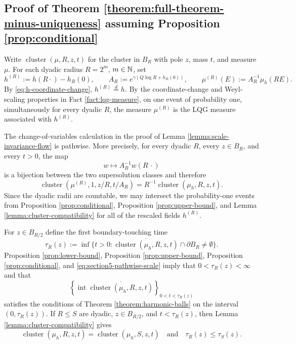 \documentclass[12pt]{amsart}
\numberwithin{equation}{section}
\begin{document}
	\subsection{Proof of Theorem \ref{theorem:full-theorem-minus-uniqueness} assuming Proposition \ref{prop:conditional}}
	Write $\operatorname{cluster}(\mu,R,z,t)$ for the cluster in $B_R$ with pole $z$, mass $t$, and measure $\mu$. For each dyadic radius $R=2^m$, $m\in\mathbb{N}$, set
	\begin{equation} \label{eq:section5-rescaled-data}
	 h^{(R)}:=h(R\cdot)-h_R(0),\qquad
	 A_R:=e^{\gamma(Q\log R+h_R(0))},\qquad
	 \mu^{(R)}(E):=A_R^{-1}\mu_h(RE).
	\end{equation}
	By \eqref{eq:h-coordinate-change}, $h^{(R)}\overset{d}{=}h$. By the coordinate-change and Weyl-scaling properties in Fact \ref{fact:lqg-measure}, on one event of probability one, simultaneously for every dyadic $R$, the measure $\mu^{(R)}$ is the LQG measure associated with $h^{(R)}$.

	The change-of-variables calculation in the proof of Lemma \ref{lemma:scale-invariance-flow} is pathwise. More precisely, for every dyadic $R$, every $z\in B_R$, and every $t>0$, the map
	\[
	 w\longmapsto A_R^{-1}w(R\,\cdot)
	\]
	is a bijection between the two supersolution classes and therefore
	\begin{equation} \label{eq:section5-pathwise-scale}
	 \operatorname{cluster}(\mu^{(R)},1,z/R,t/A_R)
	 =R^{-1}\operatorname{cluster}(\mu_h,R,z,t).
	\end{equation}
	Since the dyadic radii are countable, we may intersect the probability-one events from Proposition \ref{prop:conditional}, Proposition \ref{prop:upper-bound}, and Lemma \ref{lemma:cluster-compatibility} for all of the rescaled fields $h^{(R)}$.

	For $z\in B_{R/2}$ define the first boundary-touching time
	\begin{equation} \label{eq:section5-exit-time}
	 \tau_R(z):=\inf\big\{t>0:
	 \overline{\operatorname{cluster}(\mu_h,R,z,t)}\cap\partial B_R\neq\emptyset\big\}.
	\end{equation}
	Proposition \ref{prop:lower-bound}, Proposition \ref{prop:upper-bound}, Proposition \ref{prop:conditional}, and \eqref{eq:section5-pathwise-scale} imply that $0<\tau_R(z)<\infty$ and that
	\[
	 \left\{\operatorname{int}\overline{\operatorname{cluster}(\mu_h,R,z,t)}\right\}_{0<t<\tau_R(z)}
	\]
	satisfies the conditions of Theorem \ref{theorem:harmonic-balls} on the interval $(0,\tau_R(z))$. If $R\leq S$ are dyadic, $z\in B_{R/2}$, and $t<\tau_R(z)$, then Lemma \ref{lemma:cluster-compatibility} gives
	\begin{equation} \label{eq:section5-overlap}
	 \operatorname{cluster}(\mu_h,R,z,t)
	 =\operatorname{cluster}(\mu_h,S,z,t)
	 \quad\text{and}\quad
	 \tau_R(z)\leq\tau_S(z).
	\end{equation}
\end{document}
